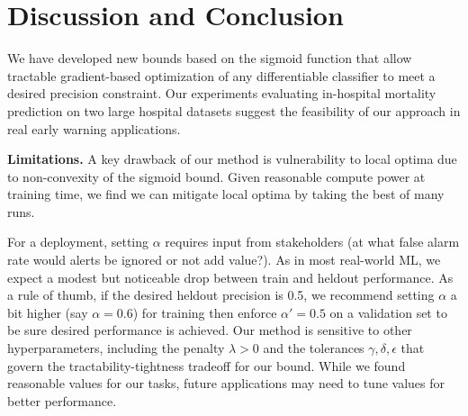 \section{Discussion and Conclusion}
\label{sec:conclusion}
We have developed new bounds based on the sigmoid function that allow tractable gradient-based optimization of any differentiable classifier to meet a desired precision constraint. Our experiments evaluating in-hospital mortality prediction on two large hospital datasets suggest the feasibility of our approach in real early warning applications.

\textbf{Limitations.} A key drawback of our method is vulnerability to local optima due to non-convexity of the sigmoid bound.
Given reasonable compute power at training time, we find we can mitigate local optima by taking the best of many runs.


For a deployment, setting $\alpha$ requires input from stakeholders (at what false alarm rate would alerts be ignored or not add value?). 
As in most real-world ML, we expect a modest but noticeable drop between train and heldout performance.
As a rule of thumb, if the desired heldout precision is 0.5, we recommend setting $\alpha$ a bit higher (say $\alpha = 0.6$) for training then enforce $\alpha' = 0.5$ on a validation set to be sure desired performance is achieved.
Our method is sensitive to other hyperparameters, including the penalty $\lambda > 0$ and the tolerances $\gamma, \delta, \epsilon$ that govern the tractability-tightness tradeoff for our bound. 
While we found reasonable values for our tasks, future applications may need to tune values for better performance.


